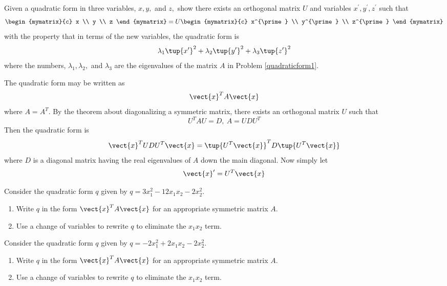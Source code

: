 \begin{enumialphparenastyle}
\begin{ex} Given a quadratic form in three variables, $x,y,$ and $z,$ show there
exists an orthogonal matrix $U$ and variables $x^{\prime },y^{\prime
},z^{\prime }$ such that 
\begin{equation*}
\begin{mymatrix}{c}
x \\ 
y \\ 
z
\end{mymatrix} =U\begin{mymatrix}{c}
x^{\prime } \\ 
y^{\prime } \\ 
z^{\prime }
\end{mymatrix}
\end{equation*}
with the property that in terms of the new variables, the quadratic form is 
\begin{equation*}
\lambda _{1}\tup{x^{\prime }} ^{2}+\lambda _{2}\tup{y^{\prime
}} ^{2}+\lambda _{3}\tup{z^{\prime }} ^{2}
\end{equation*}
where the numbers, $\lambda _{1},\lambda _{2},$ and $\lambda _{3}$ are the
eigenvalues of the matrix $A$ in Problem \ref{quadraticform1}. 
\begin{sol}
The quadratic form
may be written as
\[
\vect{x}^{T}A\vect{x}
\]
where $A=A^{T}$. By the theorem about diagonalizing a symmetric matrix,
there exists an orthogonal matrix $U$ such that
\[
U^{T}AU=D,\ A=UDU^{T}
\]
Then the quadratic form is
\[
\vect{x}^{T}UDU^{T}\vect{x}=\tup{U^{T}\vect{x}} ^{T}D\tup{
U^{T}\vect{x}}
\]
where $D$ is a diagonal matrix having the real eigenvalues of $A$ down the
main diagonal. Now simply let
\[
\vect{x}^{\prime } =  U^{T}\vect{x}
\]
\end{sol}
\end{ex}

\begin{ex} Consider the quadratic form $q$ given by $q = 3x_1^2 -12x_1x_2 - 2x_2^2$.\begin{enumerate}
\item Write $q$ in the form $\vect{x}^TA\vect{x}$ for an appropriate symmetric matrix $A$.
\item Use a change of variables to rewrite $q$ to eliminate the $x_1x_2$ term. 
\end{enumerate}
\end{ex}

\begin{ex} Consider the quadratic form $q$ given by $q = -2x_1^2 + 2x_1x_2 - 2x_2^2$.
\begin{enumerate}
\item Write $q$ in the form $\vect{x}^TA\vect{x}$ for an appropriate symmetric matrix $A$.
\item Use a change of variables to rewrite $q$ to eliminate the $x_1x_2$ term. 
\end{enumerate}
\end{ex}


\end{enumialphparenastyle}
